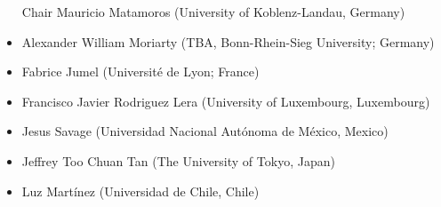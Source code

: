 \begin{itemize}
  \item[Chair] Mauricio Matamoros (University of Koblenz-Landau, Germany)
  \item Alexander William Moriarty (TBA, Bonn-Rhein-Sieg University; Germany)
  \item Fabrice Jumel (Université de Lyon; France)
  \item Francisco Javier Rodriguez Lera (University of Luxembourg, Luxembourg)
  \item Jesus Savage (Universidad Nacional Autónoma de México, Mexico)
  \item Jeffrey Too Chuan Tan (The University of Tokyo, Japan)
  \item Luz Martínez (Universidad de Chile, Chile)
\end{itemize}
